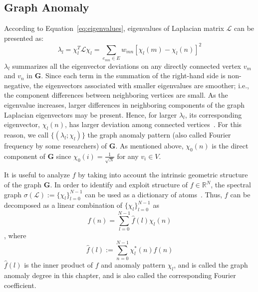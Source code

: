 \subsection{Graph Anomaly}
\label{sec:Graph_Anomaly}
According to Equation~\ref{eq:eigenvalues}, eigenvalues of Laplacian matrix $\mathcal{L}$ can be presented as:
\begin{equation}
\label{eq:lambda}
\lambda_{l}=\chi_{l}^T\mathcal{L}\chi_{l}= \sum_{e_{mn}\in E} w_
{mn}[\chi_{l}(m)-\chi_{l}(n)]^2
\end{equation}
$\lambda_l$ summarizes all the eigenvector deviations on any directly connected vertex $v_m$ and $v_n$ in $\mathbf{G}$. Since each term in the summation of the right-hand side is non-negative, the eigenvectors associated with smaller eigenvalues are smoother; i.e., the component differences between neighboring vertices are
small. As the eigenvalue increases, larger differences in neighboring
components of the graph Laplacian eigenvectors may be present.
Hence, for larger $\lambda_l$, its corresponding eigenvector, $\chi_l(n)$, has larger deviation among connected vertices~\cite{shuman2015vertex}. For this reason, we call $\{(\lambda_l;\chi_l)\}$ the graph anomaly pattern (also called Fourier frequency by some researchers) of $\mathbf{G}$. As mentioned above, $\chi_0(n)$ is the direct component of $\mathbf{G}$ since $\chi_0(i)=\frac{1}{\sqrt{N}}$ for any $v_i\in V$.


It is useful to analyze $f$ by taking into account the intrinsic geometric structure of the graph $\mathbf{G}$. In order to identify and exploit structure of $f\in \mathbb{R}^N$, the spectral graph $\sigma({\mathcal{L}}):=\{\chi_l\}_{l=0}^{N-1}$ can be used as a dictionary of atoms~\cite{shuman_ACHA_2013}. Thus, $f$ can be decomposed as a linear combination of $\{\chi_l\}_{l=0}^{N-1}$ as
\begin{equation}
\label{eq:graphFourier}
f(n)= \sum\limits_{l=0}^{N-1}\hat{f}(l)\chi_l(n)
\end{equation}
, where
\begin{equation}
\label{eq:graphFourier1}
\hat{f}(l):= \sum\limits_{n=0}^{N-1}\chi^*_l(n)f(n)
\end{equation}
$\hat{f}(l)$ is the inner product of $f$ and anomaly pattern $\chi_l$, and is called the graph anomaly degree in this chapter, and is also called the corresponding Fourier coefficient.


